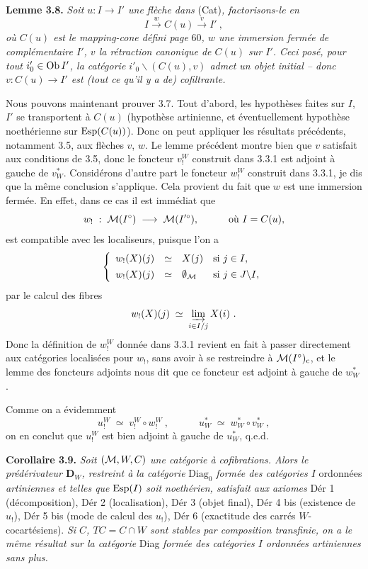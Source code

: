 \textbf{Lemme 3.8.} \textit{Soit $u : I\longrightarrow I'$ une flèche dans} (Cat)\textit{, factorisons-le en}
\[
I \xrightarrow{\;w\;} C(u) \xrightarrow{\;v\;} I'\ ,
\]
\textit{où $C(u)$ est le mapping-cone défini page} 60\textit{, $w$ une immersion fermée de complémentaire $I'$, $v$ la rétraction canonique de $C(u)$ sur $I'$. Ceci posé, pour tout $i'_0\in\operatorname{Ob} I'$, la catégorie $i'_0\backslash(C(u),v)$ admet un objet initial – donc $v : C(u)\longrightarrow I'$ est (tout ce qu'il y a de) cofiltrante.}

Nous pouvons maintenant prouver 3.7. Tout d'abord, les hypothèses faites sur $I$, $I'$ se transportent à $C(u)$ (hypothèse artinienne, et éventuellement hypothèse noethérienne sur $\operatorname{Esp}(C(u))$). Donc
on peut appliquer les résultats précédents, notamment 3.5, aux flèches $v$, $w$. Le lemme précédent montre bien que $v$ satisfait aux conditions de 3.5, donc le foncteur $v_!^W$ construit dans 3.3.1 est adjoint à gauche de $v_W^*$. Considérons d'autre part le foncteur $w_!^W$ construit dans 3.3.1, je dis que la même conclusion s'applique. Cela provient du fait que $w$ est une immersion fermée. En effet, dans ce cas il est immédiat que
\[
w_! \;:\; \M(I^\circ) \;\longrightarrow\; \M(I'^\circ), \qquad\quad \text{où } I = C(u), %
\]
est compatible avec les localiseurs, puisque l'on a
\[
\left\{
\begin{array}{lcll}
w_!(X)(j) & \simeq & X(j) & \text{si } j\in I,\\[1ex]
w_!(X)(j) & \simeq & \emptyset_{\mathcal{M}} & \text{si } j\in J\backslash I,
\end{array}
\right.
\]
par le calcul des fibres
\[
w_!(X)(j) \;\simeq\; \varinjlim_{i\in I/j} X(i)\ .
\]
Donc la définition de $w_!^W$ donnée dans 3.3.1 revient en fait à passer directement aux catégories localisées pour $w_!$, sans avoir à se restreindre à $\mathcal{M}(I^\circ)_{\mathrm{c}}$, et le lemme des foncteurs adjoints nous dit que
ce foncteur est adjoint à gauche de $w_W^*$.

Comme on a évidemment
\[
u_!^W \;\simeq\; v_!^W\circ w_!^W\ , \qquad\quad u_W^* \;\simeq\; w_W^*\circ v_W^*\ ,
\]
on en conclut que $u_!^W$ est bien adjoint à gauche de $u_W^*$, q.e.d.

\textbf{Corollaire 3.9.} \textit{Soit $(\mathcal{M},W,C)$ une catégorie à cofibrations. Alors le prédérivateur $\mathbf{D}_W$, restreint à la catégorie} $\mathrm{Diag}_0$ \textit{formée des catégories $I$} ordonnées \textit{artiniennes et telles que} $\operatorname{Esp}(I)$ \textit{soit noethérien, satisfait aux axiomes} Dér 1 (décomposition), Dér 2 (localisation), Dér 3 (objet final), Dér 4 bis (existence de $u_!$), Dér 5 bis (mode de calcul des $u_!$), Dér 6 (exactitude des carrés $W$-cocartésiens). \textit{Si $C$, $TC = C\cap W$ sont stables par composition transfinie, on a le même résultat sur la catégorie} Diag \textit{formée des catégories $I$ ordonnées artiniennes sans plus.}

